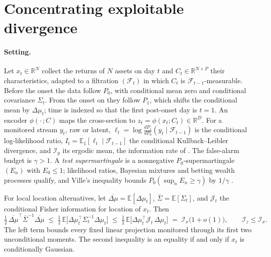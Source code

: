 \section{Concentrating exploitable divergence}\label{sec:theory}

\paragraph{Setting.}
Let $x_t\in\mathbb{R}^N$ collect the returns of $N$ assets on day $t$ and $C_t\in\mathbb{R}^{N\times P}$ their characteristics, adapted to a filtration $(\mathcal{F}_t)$ in which $C_t$ is $\mathcal{F}_{t-1}$-measurable. Before the onset the data follow $P_0$, with conditional mean zero and conditional covariance $\Sigma_t$. From the onset on they follow $P_1$, which shifts the conditional mean by $\Delta\mu_t$; time is indexed so that the first post-onset day is $t=1$. An encoder $\phi(\cdot\,;C)$ maps the cross-section to $z_t=\phi(x_t;C_t)\in\mathbb{R}^D$. For a monitored stream $y_t$, raw or latent, $\ell_t=\log\frac{dP_1}{dP_0}(y_t\mid\mathcal{F}_{t-1})$ is the conditional log-likelihood ratio, $I_t=\mathbb{E}_1[\ell_t\mid\mathcal{F}_{t-1}]$ the conditional Kullback--Leibler divergence, and $\mathcal{I}_y$ its ergodic mean, the information rate of \citet{lai_1998}. The false-alarm budget is $\gamma>1$. A \emph{test supermartingale} is a nonnegative $P_0$-supermartingale $(E_n)$ with $E_0\le1$; likelihood ratios, Bayesian mixtures and betting wealth processes qualify, and Ville's inequality bounds $P_0(\sup_nE_n\ge\gamma)$ by $1/\gamma$ \citep{ville_1939,ramdas_2023}.

\begin{proposition}\label{prop:hierarchy}
For local location alternatives, let $\overline{\Delta\mu}=\mathbb{E}[\Delta\mu_t]$, $\bar\Sigma=\mathbb{E}[\Sigma_t]$, and $\mathcal{J}_t$ the conditional Fisher information for location of $x_t$. Then
\begin{equation}\label{eq:hierarchy}
\tfrac12\,\overline{\Delta\mu}^{\top}\bar\Sigma^{-1}\overline{\Delta\mu}
\;\le\;\tfrac12\,\mathbb{E}\big[\Delta\mu_t^{\top}\Sigma_t^{-1}\Delta\mu_t\big]
\;\le\;\tfrac12\,\mathbb{E}\big[\Delta\mu_t^{\top}\mathcal{J}_t\,\Delta\mu_t\big]
\;=\;\mathcal{I}_x\big(1+o(1)\big),
\qquad \mathcal{I}_z\le\mathcal{I}_x .
\end{equation}
The left term bounds every fixed linear projection monitored through its first two unconditional moments. The second inequality is an equality if and only if $x_t$ is conditionally Gaussian.
\end{proposition}

